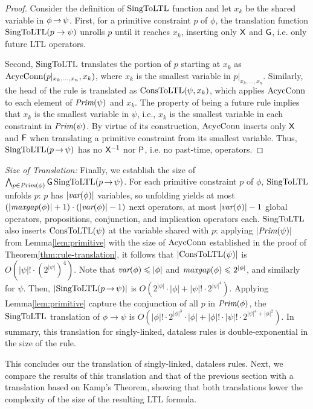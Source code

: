 \begin{proof}
Consider the definition of $\text{SingToLTL}$ function and
let $x_k$ be the shared variable in $\phi\,{\rightarrow}\,\psi$.
First,
for a primitive constraint $p$ of $\phi$,
the translation function $\text{SingToLTL}(p\rightarrow\psi)$ unrolls $p$
until it reaches $x_k$,
inserting only ${\sf X}$ and ${\sf G}$,
i.e. only future LTL operators.

Second,
$\text{SingToLTL}$ translates the portion of $p$
starting at $x_k$
as $\text{AcycConn}(p|_{x_k,...,x_n},x_k)$,
where $x_k$ is the smallest variable in $p|_{x_k,...,x_n}$.
Similarly, the head of the rule
is translated as $\text{ConsToLTL}(\psi,x_k)$,
which applies $\text{AcycConn}$
to each element of $\textit{Prim}(\psi)$ and $x_k$.
The property of being a future rule
implies that $x_k$ is the smallest variable in $\psi$, i.e.,
$x_k$ is the smallest variable in each constraint in $\textit{Prim}(\psi)$.
By virtue of its construction,
$\text{AcycConn}$ inserts only ${\sf X}$ and ${\sf F}$
when translating a primitive constraint
from its smallest variable.
Thus, $\text{SingToLTL}(p\,{\rightarrow}\,\psi)$
has no ${\sf X}^{-1}$ nor ${\sf P}$, i.e. no past-time, operators.
\end{proof}

{\it Size of Translation:}
Finally, we establish the size of $\bigwedge_{p\in\textit{Prim}(\phi)}{\sf G}\,\text{SingToLTL}(p\,{\rightarrow}\,\psi)$.
For each primitive constraint $p$ of $\phi$,
$\text{SingToLTL}$ unfolds $p$: $p$ has $|\textit{var}(\phi)|$ variables,
so unfolding yields at most $(|\textit{maxgap}(\phi)|+1) \cdot {(|\textit{var}(\phi)|-1)}$ next operators,
at most $|\textit{var}(\phi)|-1$ global operators, propositions, conjunction, and implication operators each.
$\text{SingToLTL}$ also inserts $\text{ConsToLTL}(\psi)$ at the variable shared with $p$:
applying $|\textit{Prim}(\psi)|$ from Lemma\:\ref{lem:primitive} with
the size of $\text{AcycConn}$ established in the proof of Theorem\:\ref{thm:rule-translation},
it follows that $|\text{ConsToLTL}(\psi)|$ is $O(|\psi|! \cdot (2^{|\psi|})^{4})$.
Note that
$\textit{var}(\phi) \leqslant |\phi|$
and
$\textit{maxgap}(\phi) \leqslant 2^{|\phi|}$,
and similarly for $\psi$.
Then,
$|\text{SingToLTL}(p\,{\rightarrow}\,\psi)|$ is $O(2^{|\phi|}\cdot|\phi| + |\psi|! \cdot 2^{|\psi|^{4}})$.
Applying Lemma\:\ref{lem:primitive} capture the conjunction of all $p$ in $\textit{Prim}(\phi)$,
the $\text{SingToLTL}$ translation of $\phi\rightarrow\psi$ is
$O(|\phi|! \cdot 2^{|\phi|^3}\cdot |\phi| + |\phi|! \cdot |\psi|! \cdot 2^{|\psi|^4+|\phi|^2})$.
In summary,
this translation for singly-linked, dataless rules is double-exponential in the size of the rule.

This concludes our the translation of singly-linked, dataless rules.
Next, we compare the results of this translation
and that of the previous section
with a translation based on Kamp's Theorem,
showing that both translations
lower the complexity of the size of the resulting LTL formula.

